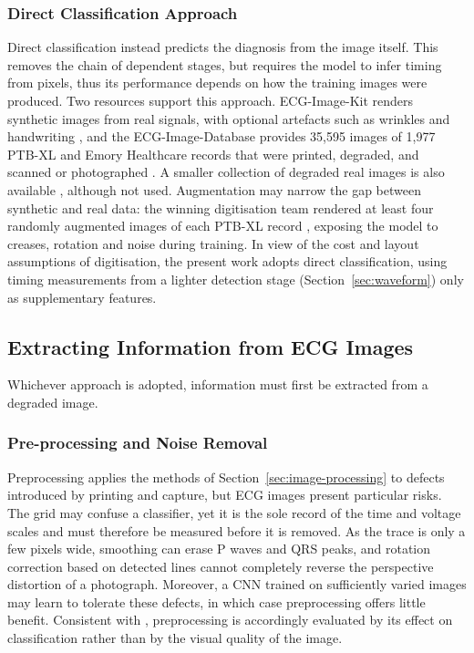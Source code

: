\documentclass[12pt,nonacm,acmlarge,titlepage,screen]{acmart}
\begin{document}
\subsubsection{Direct Classification Approach}
\label{sec:direct-classification}

Direct classification instead predicts the diagnosis from the image itself. This removes the chain of dependent stages, but requires the model to infer timing from pixels, thus its performance depends on how the training images were produced. Two resources support this approach. ECG-Image-Kit renders synthetic images from real signals, with optional artefacts such as wrinkles and handwriting \cite{shivashankara_ecg-image-kit_2024}, and the ECG-Image-Database provides 35,595 images of 1,977 PTB-XL and Emory Healthcare records that were printed, degraded, and scanned or photographed \cite{reyna_ecg-image-database_2024}. A smaller collection of degraded real images is also available \cite{khan_ecg_2021}, although not used. Augmentation may narrow the gap between synthetic and real data: the winning digitisation team rendered at least four randomly augmented images of each PTB-XL record \cite{krones_combining_2024}, exposing the model to creases, rotation and noise during training. In view of the cost and layout assumptions of digitisation, the present work adopts direct classification, using timing measurements from a lighter detection stage (Section~\ref{sec:waveform}) only as supplementary features.

\subsection{Extracting Information from ECG Images}
\label{sec:extract-group}

Whichever approach is adopted, information must first be extracted from a degraded image.

\subsubsection{Pre-processing and Noise Removal}
\label{sec:preprocessing}

Preprocessing applies the methods of Section~\ref{sec:image-processing} to defects introduced by printing and capture, but ECG images present particular risks. The grid may confuse a classifier, yet it is the sole record of the time and voltage scales and must therefore be measured before it is removed. As the trace is only a few pixels wide, smoothing can erase P waves and QRS peaks, and rotation correction based on detected lines cannot completely reverse the perspective distortion of a photograph. Moreover, a CNN trained on sufficiently varied images may learn to tolerate these defects, in which case preprocessing offers little benefit. Consistent with \citet{barrett_foundations_2004}, preprocessing is accordingly evaluated by its effect on classification rather than by the visual quality of the image.
\end{document}
